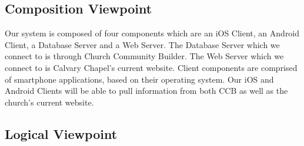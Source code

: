 \documentclass[letterpaper,10pt,draftclsnofoot,onecolumn,titlepage]{IEEEtran}
\begin{document}

		\subsection{Composition Viewpoint}
			Our system is composed of four components which are an iOS Client, an Android Client, a Database Server and a Web Server.
			The Database Server which we connect to is through Church Community Builder.
			The Web Server which we connect to is Calvary Chapel's current website.
			Client components are comprised of smartphone applications, based on their operating system.
			Our iOS and Android Clients will be able to pull information from both CCB as well as the church's current website.


		\subsection{Logical Viewpoint}
\end{document}
